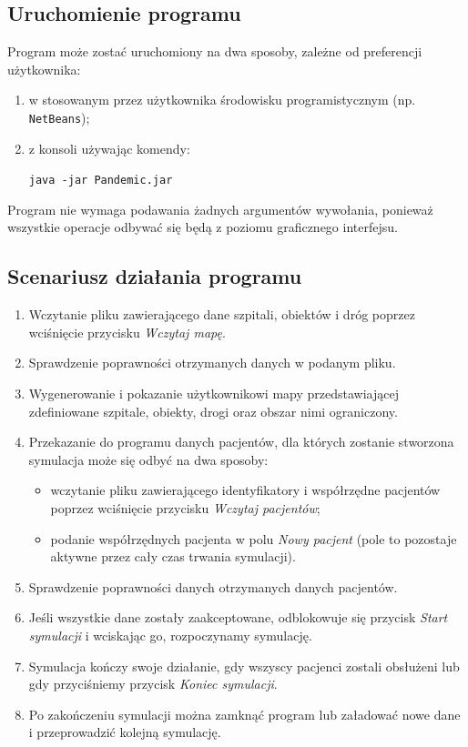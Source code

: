 \documentclass[12pt,a4paper]{article}
\begin{document}
\subsection{Uruchomienie programu}
Program może zostać uruchomiony na dwa sposoby, zależne od preferencji użytkownika: 
\begin{enumerate}
\item w stosowanym przez użytkownika środowisku programistycznym (np. \texttt{NetBeans});
\item z konsoli używając komendy:
\begin{center}
\texttt{java -jar Pandemic.jar}
\end{center}
\end{enumerate}

Program nie wymaga podawania żadnych argumentów wywołania, ponieważ wszystkie operacje odbywać się będą z poziomu graficznego interfejsu.

\subsection{Scenariusz działania programu}
\begin{enumerate}
\item Wczytanie pliku zawierającego dane szpitali, obiektów i dróg poprzez wciśnięcie przycisku \textit{Wczytaj mapę}.
\item Sprawdzenie poprawności otrzymanych danych w podanym pliku.
\item Wygenerowanie i pokazanie użytkownikowi mapy przedstawiającej zdefiniowane szpitale, obiekty, drogi oraz obszar nimi ograniczony.
\item Przekazanie do programu danych pacjentów, dla których zostanie stworzona symulacja może się odbyć na dwa sposoby:
\begin{itemize}
\item wczytanie pliku zawierającego identyfikatory i współrzędne pacjentów poprzez wciśnięcie przycisku \textit{Wczytaj pacjentów}; 
\item podanie współrzędnych pacjenta w polu \textit{Nowy pacjent} (pole to pozostaje aktywne przez cały czas trwania symulacji).
\end{itemize}
\item Sprawdzenie poprawności danych otrzymanych danych pacjentów.
\item Jeśli wszystkie dane zostały zaakceptowane, odblokowuje się przycisk \textit{Start symulacji} i wciskając go, rozpoczynamy symulację.
\item Symulacja kończy swoje działanie, gdy wszyscy pacjenci zostali obsłużeni lub gdy przyciśniemy przycisk \textit{Koniec symulacji}.
\item Po zakończeniu symulacji można zamknąć program lub załadować nowe dane i przeprowadzić kolejną symulację.
\end{enumerate}
\end{document}
